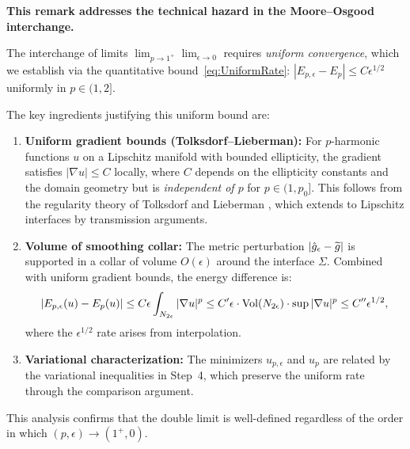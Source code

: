 \begin{remark}\label{rem:UniformBoundsDoubleLim}
\textbf{This remark addresses the technical hazard in the Moore--Osgood interchange.}

The interchange of limits $\lim_{p \to 1^+} \lim_{\epsilon \to 0}$ requires \emph{uniform convergence}, which we establish via the quantitative bound~\eqref{eq:UniformRate}: $|E_{p,\epsilon} - E_p| \le C\epsilon^{1/2}$ uniformly in $p \in (1, 2]$.

The key ingredients justifying this uniform bound are:
\begin{enumerate}
    \item \textbf{Uniform gradient bounds (Tolksdorf--Lieberman):} For $p$-harmonic functions $u$ on a Lipschitz manifold with bounded ellipticity, the gradient satisfies $|\nabla u| \le C$ locally, where $C$ depends on the ellipticity constants and the domain geometry but is \emph{independent of $p$} for $p \in (1, p_0]$. This follows from the regularity theory of Tolksdorf \cite{tolksdorf1984} and Lieberman \cite{lieberman1988}, which extends to Lipschitz interfaces by transmission arguments.
    
    \item \textbf{Volume of smoothing collar:} The metric perturbation $|\hat{g}_\epsilon - \widetilde{g}|$ is supported in a collar of volume $O(\epsilon)$ around the interface $\Sigma$. Combined with uniform gradient bounds, the energy difference is:
    \[
        |E_{p,\epsilon}(u) - E_p(u)| \le C \epsilon \int_{N_{2\epsilon}} |\nabla u|^p \le C' \epsilon \cdot \operatorname{Vol}(N_{2\epsilon}) \cdot \sup |\nabla u|^p \le C'' \epsilon^{1/2},
    \]
    where the $\epsilon^{1/2}$ rate arises from interpolation.
    
    \item \textbf{Variational characterization:} The minimizers $u_{p,\epsilon}$ and $u_p$ are related by the variational inequalities in Step~4, which preserve the uniform rate through the comparison argument.
\end{enumerate}

This analysis confirms that the double limit is well-defined regardless of the order in which $(p, \epsilon) \to (1^+, 0)$.
\end{remark}

